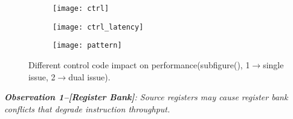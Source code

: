 \begin{figure*}
    \begin{subfigure}[htbp]{0.3\textwidth}
        \texttt{[image: ctrl]}
        \subcaption{}
        \label{fig:control_throughput}
    \end{subfigure}
    \begin{subfigure}[htbp]{0.3\textwidth}
        \texttt{[image: ctrl\_latency]}
        \subcaption{}
        \label{fig:control_latency}
    \end{subfigure}
    \begin{subfigure}[htbp]{0.3\textwidth}
        \texttt{[image: pattern]}
        \subcaption{}
        \label{fig:control_pattern}
    \end{subfigure}
    \caption{\small Different control code impact on performance(subfigure(), 1$\rightarrow$single
    issue, 2$\rightarrow$dual issue).}
    \label{fig:control_code}
\end{figure*}


{\em {\bf Observation 1--[Register Bank]}:
Source registers may cause register bank conflicts that degrade instruction throughput.}

